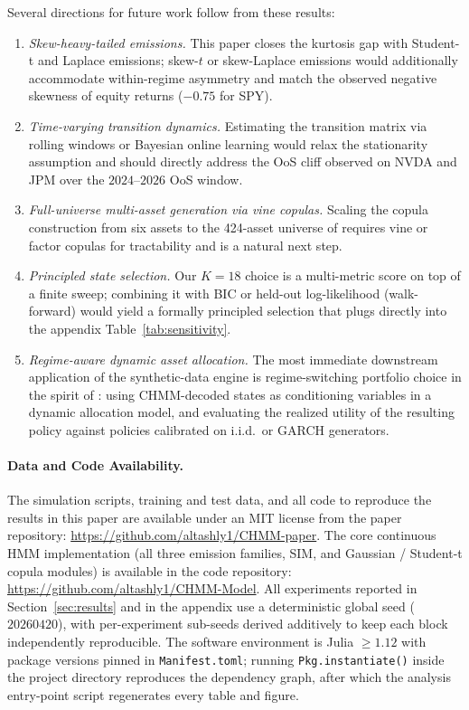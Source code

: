 Several directions for future work follow from these results:
\begin{enumerate}
    \item \textit{Skew-heavy-tailed emissions.}
    This paper closes the kurtosis gap with Student-t and Laplace emissions; skew-$t$ or skew-Laplace emissions would additionally accommodate within-regime asymmetry and match the observed negative skewness of equity returns ($-0.75$ for SPY).

    \item \textit{Time-varying transition dynamics.}
    Estimating the transition matrix via rolling windows or Bayesian online learning would relax the stationarity assumption and should directly address the OoS cliff observed on NVDA and JPM over the $2024$--$2026$ OoS window.

    \item \textit{Full-universe multi-asset generation via vine copulas.}
    Scaling the copula construction from six assets to the 424-asset universe of \citet{alswaidan2026hybrid} requires vine or factor copulas for tractability and is a natural next step.

    \item \textit{Principled state selection.}
    Our $K = 18$ choice is a multi-metric score on top of a finite sweep; combining it with BIC or held-out log-likelihood (walk-forward) would yield a formally principled selection that plugs directly into the appendix Table~\ref{tab:sensitivity}.

    \item \textit{Regime-aware dynamic asset allocation.}
    The most immediate downstream application of the synthetic-data engine is regime-switching portfolio choice in the spirit of \citet{baekimmulvey2014}: using CHMM-decoded states as conditioning variables in a dynamic allocation model, and evaluating the realized utility of the resulting policy against policies calibrated on i.i.d.\ or GARCH generators.
\end{enumerate}

\paragraph{Data and Code Availability.}
The simulation scripts, training and test data, and all code to reproduce the results in this paper are available under an MIT license from the paper repository: \url{https://github.com/altashly1/CHMM-paper}.
The core continuous HMM implementation (all three emission families, SIM, and Gaussian / Student-t copula modules) is available in the code repository: \url{https://github.com/altashly1/CHMM-Model}.
All experiments reported in Section~\ref{sec:results} and in the appendix use a deterministic global seed ($20260420$), with per-experiment sub-seeds derived additively to keep each block independently reproducible.
The software environment is Julia $\geq 1.12$ with package versions pinned in \texttt{Manifest.toml}; running \texttt{Pkg.instantiate()} inside the project directory reproduces the dependency graph, after which the analysis entry-point script regenerates every table and figure.

